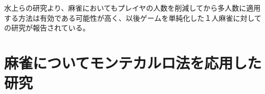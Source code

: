 水上らの研究より、麻雀においてもプレイヤの人数を削減してから多人数に適用する方法は有効である可能性が高く、以後ゲームを単純化した１人麻雀に対しての研究が報告されている。






\section{麻雀についてモンテカルロ法を応用した研究}
